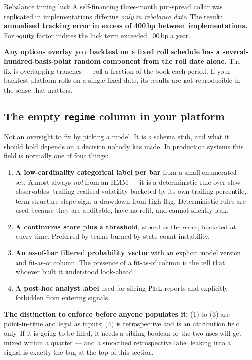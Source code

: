\documentclass[11pt,a4paper]{article}
\begin{document}
\begin{keyfact}{Rebalance timing luck}
A self-financing three-month put-spread collar was replicated in implementations
differing \emph{only in rebalance date}. The result: \textbf{annualised tracking
error in excess of 400\,bp between implementations.} For equity factor indices the
luck term exceeded 100\,bp a year.

\textbf{Any options overlay you backtest on a fixed roll schedule has a
several-hundred-basis-point random component from the roll date alone.} The fix is
overlapping tranches --- roll a fraction of the book each period. If your backtest
platform rolls on a single fixed date, its results are not reproducible in the
sense that matters.
\end{keyfact}

\subsection{The empty \texttt{regime} column in your platform}

Not an oversight to fix by picking a model. It is a schema stub, and what it should
hold depends on a decision nobody has made. In production systems this field is
normally one of four things:

\begin{enumerate}
\item \textbf{A low-cardinality categorical label per bar} from a small enumerated
set. Almost always \emph{not} from an HMM --- it is a deterministic rule over slow
observables: trailing realised volatility bucketed by its own trailing percentile,
term-structure slope sign, a drawdown-from-high flag. Deterministic rules are used
because they are auditable, have no refit, and cannot silently leak.
\item \textbf{A continuous score plus a threshold}, stored as the score, bucketed at
query time. Preferred by teams burned by state-count instability.
\item \textbf{An as-of-bar filtered probability vector} with an explicit model
version and fit-as-of column. The presence of a fit-as-of column is the tell that
whoever built it understood look-ahead.
\item \textbf{A post-hoc analyst label} used for slicing P\&L reports and
explicitly forbidden from entering signals.
\end{enumerate}

\textbf{The distinction to enforce before anyone populates it:} (1) to (3) are
point-in-time and legal as inputs; (4) is retrospective and is an attribution field
only. If it is going to be filled, it needs a sibling boolean or the two uses will
get mixed within a quarter --- and a smoothed retrospective label leaking into a
signal is exactly the bug at the top of this section.
\end{document}
